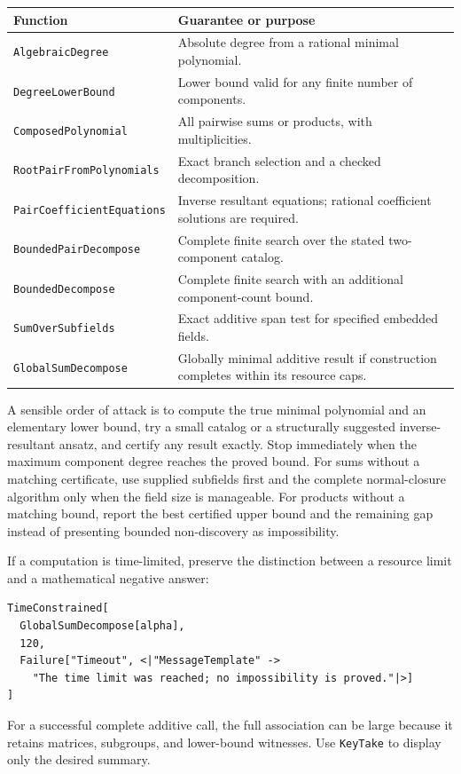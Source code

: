 \documentclass[11pt,a4paper]{article}
\newcommand{\code}[1]{\texttt{#1}}
\theoremstyle{definition}
\theoremstyle{remark}
\begin{document}
\begin{center}
\small
\begin{tabular}{@{}p{}p{}@{}}
\toprule
Function & Guarantee or purpose\\
\midrule
\code{AlgebraicDegree} & Absolute degree from a rational minimal polynomial.\\
\code{DegreeLowerBound} & Lower bound valid for any finite number of components.\\
\code{ComposedPolynomial} & All pairwise sums or products, with multiplicities.\\
\code{RootPairFromPolynomials} & Exact branch selection and a checked decomposition.\\
\code{PairCoefficientEquations} & Inverse resultant equations; rational coefficient solutions are required.\\
\code{BoundedPairDecompose} & Complete finite search over the stated two-component catalog.\\
\code{BoundedDecompose} & Complete finite search with an additional component-count bound.\\
\code{SumOverSubfields} & Exact additive span test for specified embedded fields.\\
\code{GlobalSumDecompose} & Globally minimal additive result if construction completes within its resource caps.\\
\bottomrule
\end{tabular}
\end{center}

A sensible order of attack is to compute the true minimal polynomial and an elementary lower bound, try a small catalog or a structurally suggested inverse-resultant ansatz, and certify any result exactly. Stop immediately when the maximum component degree reaches the proved bound. For sums without a matching certificate, use supplied subfields first and the complete normal-closure algorithm only when the field size is manageable. For products without a matching bound, report the best certified upper bound and the remaining gap instead of presenting bounded non-discovery as impossibility.

If a computation is time-limited, preserve the distinction between a resource limit and a mathematical negative answer:
\begin{lstlisting}
TimeConstrained[
  GlobalSumDecompose[alpha],
  120,
  Failure["Timeout", <|"MessageTemplate" ->
    "The time limit was reached; no impossibility is proved."|>]
]
\end{lstlisting}
For a successful complete additive call, the full association can be large because it retains matrices, subgroups, and lower-bound witnesses. Use \code{KeyTake} to display only the desired summary.
\end{document}
